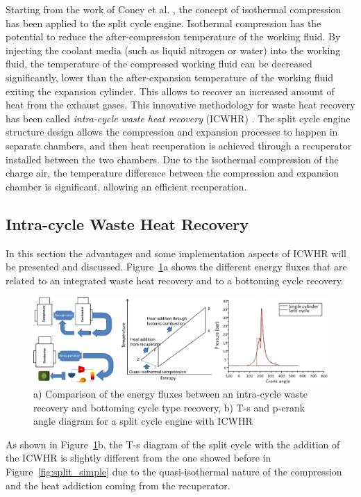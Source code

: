 Starting from the work of Coney et al. \cite{Coney2004}, the concept of isothermal compression has been applied to the split cycle engine. Isothermal compression has the potential to reduce the after-compression temperature of the working fluid. By injecting the coolant media (such as liquid nitrogen or water) into the working fluid, the temperature of the compressed working fluid can be decreased significantly, lower than the after-expansion temperature of the working fluid exiting the expansion cylinder. This allows to recover an increased amount of heat from the exhaust gases. This innovative methodology for waste heat recovery has been called \emph{intra-cycle waste heat recovery} (ICWHR) \cite{Coney2004, Dong2015, Morgan2016}. The split cycle engine structure design allows the compression and expansion processes to happen in separate chambers, and then heat recuperation is achieved through a recuperator installed between the two chambers. Due to the isothermal compression of the charge air, the temperature difference between the compression and expansion chamber is significant, allowing an efficient recuperation.

\subsection{Intra-cycle Waste Heat Recovery}

In this section the advantages and some implementation aspects of ICWHR will be presented and discussed. Figure~\ref{fig:ICWHR_vs_ORC}a shows the different energy fluxes that are related to an integrated waste heat recovery and to a bottoming cycle recovery.

\begin{figure}[ht]
  \centering
  \includegraphics[width=\textwidth]{figures/review/ICWHR_vs_ORC.pdf}
  \caption{a) Comparison of the energy fluxes between an intra-cycle waste recovery and bottoming cycle type recovery, b) T-s and p-crank angle diagram for a split cycle engine with ICWHR\label{fig:ICWHR_vs_ORC} }
\end{figure}

As shown in Figure~\ref{fig:ICWHR_vs_ORC}b, the T-s diagram of the split cycle with the addition of the ICWHR is slightly different from the one showed before in Figure~\ref{fig:split_simple} due to the quasi-isothermal nature of the compression and the heat addiction coming from the recuperator.

